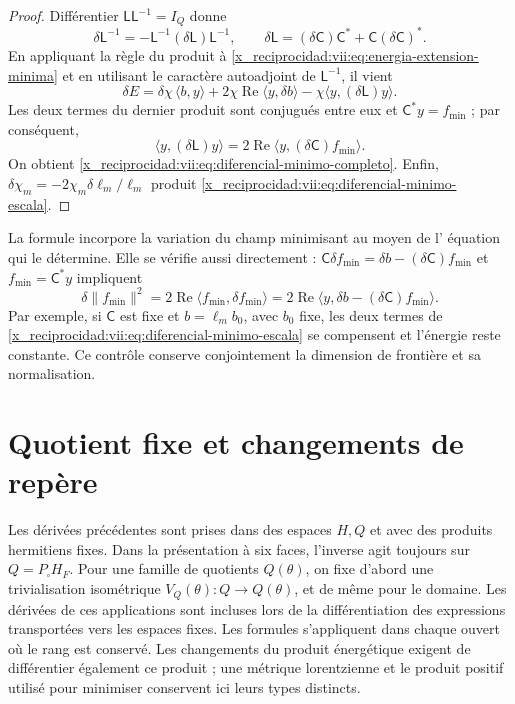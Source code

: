 \begin{proof}
Différentier \(\mathsf L\mathsf L^{-1}=I_Q\) donne
\[
 \delta\mathsf L^{-1}
 =-\mathsf L^{-1}(\delta\mathsf L)\mathsf L^{-1},\qquad
 \delta\mathsf L=(\delta\mathsf C)\mathsf C^*
                      +\mathsf C(\delta\mathsf C)^*.
\]
En appliquant la règle du produit à \eqref{x_reciprocidad:vii:eq:energia-extension-minima} et en utilisant le caractère autoadjoint de \(\mathsf L^{-1}\), il vient
\[
 \delta E=\delta\chi\,\langle b,y\rangle
 +2\chi\operatorname{Re}\langle y,\delta b\rangle
 -\chi\langle y,(\delta\mathsf L)y\rangle.
\]
Les deux termes du dernier produit sont conjugués entre eux et
\(\mathsf C^*y=f_{\min}\) ; par conséquent,
\[
 \langle y,(\delta\mathsf L)y\rangle
 =2\operatorname{Re}\langle y,(\delta\mathsf C)f_{\min}\rangle.
\]
On obtient \eqref{x_reciprocidad:vii:eq:diferencial-minimo-completo}. Enfin, \(\delta\chi_m=-2\chi_m\delta\ell_m/\ell_m\) produit \eqref{x_reciprocidad:vii:eq:diferencial-minimo-escala}.
\end{proof}

La formule incorpore la variation du champ minimisant au moyen de l'
équation qui le détermine. Elle se vérifie aussi directement :
\(\mathsf C\delta f_{\min}=\delta b-(\delta\mathsf C)f_{\min}\)
et \(f_{\min}=\mathsf C^*y\) impliquent
\[
 \delta\|f_{\min}\|^2
 =2\operatorname{Re}\langle f_{\min},\delta f_{\min}\rangle
 =2\operatorname{Re}
     \langle y,\delta b-(\delta\mathsf C)f_{\min}\rangle.
\]
Par exemple, si \(\mathsf C\) est fixe et \(b=\ell_m b_0\), avec
\(b_0\) fixe, les deux termes de
\eqref{x_reciprocidad:vii:eq:diferencial-minimo-escala} se compensent et l'énergie
reste constante. Ce contrôle conserve conjointement la dimension
de frontière et sa normalisation.

\section{Quotient fixe et changements de repère}
\label{x_reciprocidad:vii:subsec:marcos-minimo}

Les dérivées précédentes sont prises dans des espaces \(H,Q\) et avec des produits hermitiens fixes. Dans la présentation à six faces, l'inverse agit toujours sur \(Q=P_\square H_F\). Pour une famille de quotients \(Q(\theta)\), on fixe d'abord une trivialisation isométrique \(V_Q(\theta):Q\to Q(\theta)\), et de même pour le domaine. Les dérivées de ces applications sont incluses lors de la différentiation des expressions transportées vers les espaces fixes. Les formules s'appliquent dans chaque ouvert où le rang est conservé. Les changements du produit énergétique exigent de différentier également ce produit ; une métrique lorentzienne et le produit positif utilisé pour minimiser conservent ici leurs types distincts.

